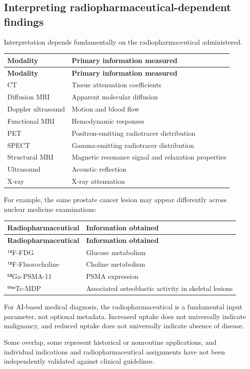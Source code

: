 \subsection{Interpreting radiopharmaceutical-dependent findings}
Interpretation depends fundamentally on the radiopharmaceutical administered.
\begin{longtable}{@{}p{}p{}@{}}
\toprule
\textbf{Modality} & \textbf{Primary information measured} \\
\midrule
\endfirsthead
\toprule
\textbf{Modality} & \textbf{Primary information measured} \\
\midrule
\endhead
CT & Tissue attenuation coefficients \\
Diffusion MRI & Apparent molecular diffusion \\
Doppler ultrasound & Motion and blood flow \\
Functional MRI & Hemodynamic responses \\
PET & Positron-emitting radiotracer distribution \\
SPECT & Gamma-emitting radiotracer distribution \\
Structural MRI & Magnetic resonance signal and relaxation properties \\
Ultrasound & Acoustic reflection \\
X-ray & X-ray attenuation \\
\bottomrule
\end{longtable}

For example, the same prostate cancer lesion may appear differently across nuclear medicine examinations:
\begin{longtable}{@{}p{}p{}@{}}
\toprule
\textbf{Radiopharmaceutical} & \textbf{Information obtained} \\
\midrule
\endfirsthead
\toprule
\textbf{Radiopharmaceutical} & \textbf{Information obtained} \\
\midrule
\endhead
¹⁸F-FDG & Glucose metabolism \\
¹⁸F-Fluorocholine & Choline metabolism \\
⁶⁸Ga-PSMA-11 & PSMA expression \\
⁹⁹ᵐTc-MDP & Associated osteoblastic activity in skeletal lesions \\
\bottomrule
\end{longtable}

For AI-based medical diagnosis, the radiopharmaceutical is a fundamental input parameter, not optional metadata. Increased uptake does not universally indicate malignancy, and reduced uptake does not universally indicate absence of disease.

 Some overlap, some represent historical or nonroutine applications, and individual indications and radiopharmaceutical assignments have not been independently validated against clinical guidelines.
